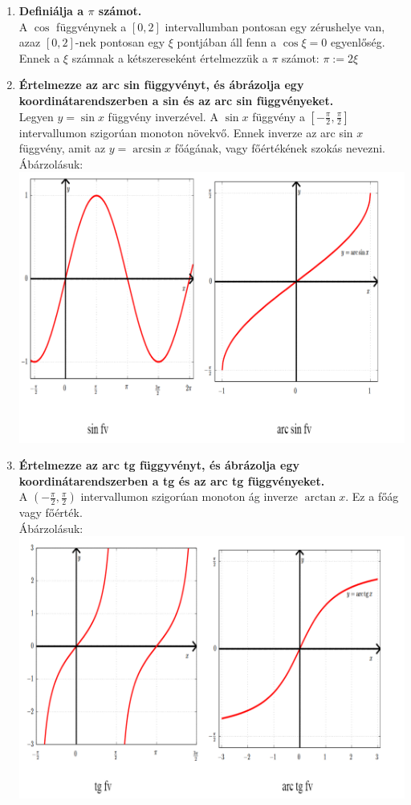 \documentclass[a4paper,11pt]{article}
\begin{document}
\def\Z{\mathbb{Z}}
\def\R{\mathbb{R}}
\def\rtr{\R\to\R}
\def\D{\mathcal{D}}
\def\dab{\in\D(a,b)}
\def\fabr{f:(a,b)\to\R}
\begin{enumerate}
	\item \textbf{Definiálja a $\pi$ számot.}\\[0.1cm]A $\cos$ függvénynek a $[0,2]$ intervallumban pontosan egy zérushelye van, azaz $[0,2]$-nek pontosan egy $\xi$ pontjában áll fenn a $\cos\xi=0$ egyenlőség. Ennek a $\xi$ számnak a kétszereseként értelmezzük a $\pi$ számot: $\pi:=2\xi$
	\item \textbf{Értelmezze az arc sin függyvényt, és ábrázolja egy koordinátarendszerben a sin és az arc sin függvényeket.}\\[0.1cm]Legyen $y=\sin x$ függvény inverzével. A $\sin x$ függvény a $[-\frac{\pi}{2},\frac{\pi}{2}]$ intervallumon szigorúan monoton növekvő. Ennek inverze az arc sin $x$ függvény, amit az $y=\arcsin x$ főágának, vagy főértékének szokás nevezni.\\[0.1cm]Ábárzolásuk:\\[0.1cm]
	\includegraphics[width=15cm]{kepek/sin.png}
	\item \textbf{Értelmezze az arc tg függyvényt, és ábrázolja egy koordinátarendszerben a tg és az arc tg függvényeket.}\\[0.1cm]A $(-\frac{\pi}{2},\frac{\pi}{2})$ intervallumon szigorúan monoton ág inverze $\arctan x$. Ez a főág vagy főérték.\\[0.1cm]Ábárzolásuk:\\[0.1cm]
	\includegraphics[width=15cm]{kepek/tan.png}

\end{enumerate}
\end{document}
